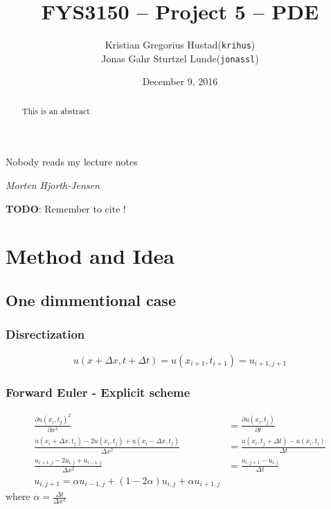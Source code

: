 \documentclass[10pt,a4paper]{article}
\begin{document}
\title{FYS3150 -- Project 5 -- PDE}
\author{
	\begin{tabular}{rl}
        Kristian Gregorius Hustad & (\texttt{krihus})\\
        Jonas Gahr Sturtzel Lunde & (\texttt{jonassl})
	\end{tabular}}
\date{December 9, 2016}
\maketitle



\setlength{\epigraphwidth}{0.75\textwidth}
\renewcommand{\epigraphflush}{center}
\renewcommand{\beforeepigraphskip}{50pt}
\renewcommand{\afterepigraphskip}{100pt}
\renewcommand{\epigraphsize}{\normalsize}
\epigraph{Nobody reads my lecture notes}
	{\textit{Morten Hjorth-Jensen}}

\begin{abstract}
\noindent
This is an abstract
\end{abstract}

\pagebreak




\textbf{TODO}: Remember to cite \cite{hpl_fdm}!

\section{Method and Idea}
\subsection{One dimmentional case}
\subsubsection{Disrectization}
\begin{equation}
u(x+\Delta x, t+\Delta t) = u(x_{i+1},t_{i+1}) = u_{i+1,j+1}
\end{equation}

\subsubsection{Forward Euler - Explicit scheme}
\begin{align}
\frac{\partial u(x_i,t_j)^2}{\partial x^2} &= \frac{\partial u(x_i,t_j)}{\partial t} \\
\frac{u(x_i + \Delta x, t_j) - 2u(x_i,t_j) + u(x_i - \Delta x, t_j)}{\Delta x^2}
&= \frac{u(x_i, t_j + \Delta t) - u(x_i, t_i)}{\Delta t} \\
\frac{u_{i+1,j} - 2u_{i,j}+u_{i-1,j}}{\Delta x^2} &= \frac{u_{i,j+1} - u_{i,j}}{\Delta t} \\
u_{i,j+1} = \alpha u_{i-1,j} + (1-2\alpha)u_{i,j} + \alpha u_{i+1,j}
\end{align}
where $\alpha = \frac{\Delta t}{\Delta x^2}$
\end{document}
